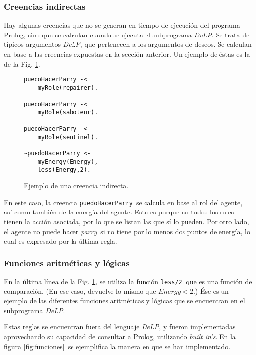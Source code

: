 \documentclass[oneside]{book}
\begin{document}
\subsubsection{Creencias indirectas}

\label{sec:creeciasIndirectas}

Hay algunas creencias que no se generan en tiempo de ejecución del programa Prolog, sino
que se calculan cuando se ejecuta el subprograma \textit{DeLP}. Se trata de típicos argumentos
\textit{DeLP}, que pertenecen a los argumentos de deseos. Se calculan en base a las creencias
expuestas en la sección anterior. Un ejemplo de éstas es la de la Fig. 
\ref{fig:creenciaIndirecta}.

\begin{figure}
\begin{verbatim}
puedoHacerParry -<
    myRole(repairer).

puedoHacerParry -<
    myRole(saboteur).

puedoHacerParry -<
    myRole(sentinel).

~puedoHacerParry <-
    myEnergy(Energy),
    less(Energy,2).
\end{verbatim}

\caption{Ejemplo de una creencia indirecta.}
\label{fig:creenciaIndirecta}

\end{figure}

En este caso, la creencia \texttt{puedoHacerParry}\ se calcula en base al rol del 
agente,
así como también de la energía del agente. Esto es porque no todos los roles tienen la
acción asociada, por lo que se listan las que sí lo pueden. Por otro lado, el agente
no puede hacer \textit{parry}\ si no tiene por lo menos dos puntos de energía, lo cual
es expresado por la última regla.

\subsubsection{Funciones aritméticas y lógicas}

En la última línea de la Fig. \ref{fig:creenciaIndirecta}, se utiliza la función 
\texttt{less/2}, que es una función de comparación. (En ese caso, devuelve lo mismo
que $Energy < 2$.) Ése es un ejemplo de las diferentes funciones aritméticas y 
lógicas que se encuentran en el subprograma \textit{DeLP}.

Estas reglas se encuentran fuera del lenguaje \textit{DeLP}, y fueron implementadas 
aprovechando su capacidad de consultar a Prolog, utilizando \textit{built in's}.
En la figura \ref{fig:funciones}\ se ejemplifica la manera en que se han 
implementado.
\end{document}
